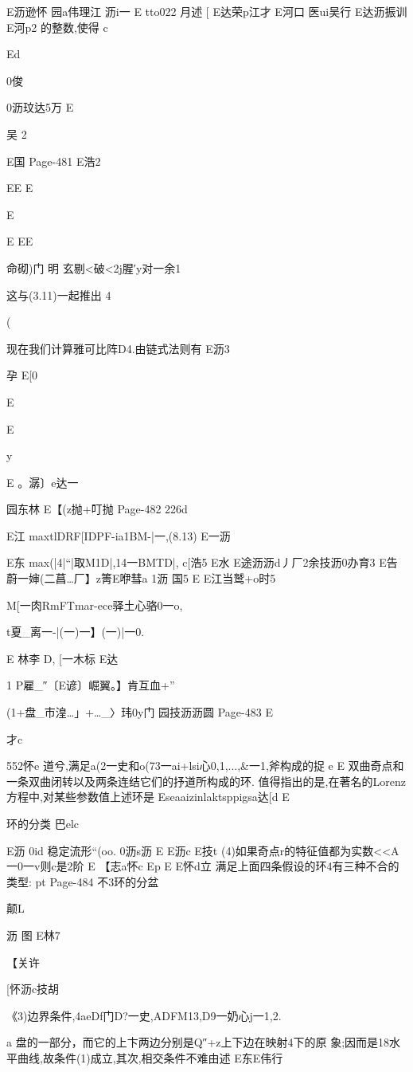 {{{{E沥逊怀
园a伟理江
沥i一
E
tto022
月述
[
E达荣p江才
E河口
医ui吴行
E达沥振训
E河p2
的整数,使得
c

Ed

0俊

0沥玟达5万
E

吴
2

E国
Page-481
E浩2

EE
E

E

E
EE

命砌)门
明
玄剔<破<2j腥′y对一余1

这与(3.11)一起推出
4

(

现在我们计算雅可比阵D4.由链式法则有
E沥3

孕
E[0

E

E

y

E
。潺〕e达一

园东林
E【(z抛+叮抛%
Page-482
226d

E江
maxtlDRF[IDPF-ia1BM-|一,(8.13)
E一沥

E东
max(|4|“|取M1D|,14一BMTD|,
c[浩5
E水
E途沥沥d丿厂2余技沥0办育3
E告蔚一婶(二菖…厂】z箐E咿彗a
1沥
国5
E
E江当鹫+o时5

M[一肉RmFTmar-ece驿土心骆0一o,

t夏_离一-|(一)一】(一)|一0.

E
林李
D,
[一木标
E达

1
P雇_″〔E谚〕崛翼。】肯互血+”

(1+盘_市湟…」+…_〉玮0y门
园技沥沥圆
Page-483
E

才c

552怀e
道兮,满足a(2一史和o(73一ai+lsi心0,1,...,&一1,斧构成的捉
e
E
双曲奇点和一条双曲闭转以及两条连结它们的抒道所构成的环.
值得指出的是,在著名的Lorenz方程中,对某些参数值上述环是
Eseaaizinlaktsppigsa达[d
E

环的分类
巴elc

E沥
0id
稳定流形“(oo.
0沥s沥
E
E沥c
E技t
(4)如果奇点r的特征值都为实数<<A一0一v则c是2阶
E
【志a怀c
Ep
E
E怀d立
满足上面四条假设的环4有三种不合的类型:
pt
Page-484
不3环的分盆

颠L

沥
图
E林7

【关许

[怀沥c技胡

《3)边界条件,4aeDf门D?一史,ADFM13,D9一奶心j一1,2.

a
盘的一部分，而它的上卞两边分别是Q″+z上下边在映射4下的原
象;因而是18水平曲线,故条件(1)成立,其次,相交条件不难由述
E东E伟行

}}}}
